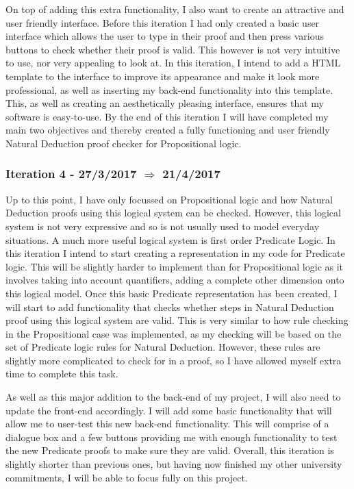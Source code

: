 On top of adding this extra functionality, I also want to create an attractive and user friendly interface. Before this iteration I had only created a basic user interface which allows the user to type in their proof and then press various buttons to check whether their proof is valid. This however is not very intuitive to use, nor very appealing to look at. In this iteration, I intend to add a HTML template to the interface to improve its appearance and make it look more professional, as well as inserting my back-end functionality into this template. This, as well as creating an aesthetically pleasing interface, ensures that my software is easy-to-use. By the end of this iteration I will have completed my main two objectives and thereby created a fully functioning and user friendly Natural Deduction proof checker for Propositional logic.

\subsubsection{Iteration 4 - 27/3/2017 $\Rightarrow$ 21/4/2017}

Up to this point, I have only focussed on Propositional logic and how Natural Deduction proofs using this logical system can be checked. However, this logical system is not very expressive and so is not usually used to model everyday situations. A much more useful logical system is first order Predicate Logic. In this iteration I intend to start creating a representation in my code for Predicate logic. This will be slightly harder to implement than for Propositional logic as it involves taking into account quantifiers, adding a complete other dimension onto this logical model. Once this basic Predicate representation has been created, I will start to add functionality that checks whether steps in Natural Deduction proof using this logical system are valid. This is very similar to how rule checking in the Propositional case was implemented, as my checking will be based on the set of Predicate logic rules for Natural Deduction. However, these rules are slightly more complicated to check for in a proof, so I have allowed myself extra time to complete this task. 

As well as this major addition to the back-end of my project, I will also need to update the front-end accordingly. I will add some basic functionality that will allow me to user-test this new back-end functionality. This will comprise of a dialogue box and a few buttons providing me  with enough functionality to test the new Predicate proofs to make sure they are valid. Overall, this iteration is slightly shorter than previous ones, but having now finished my other university commitments, I will be able to focus fully on this project. 

